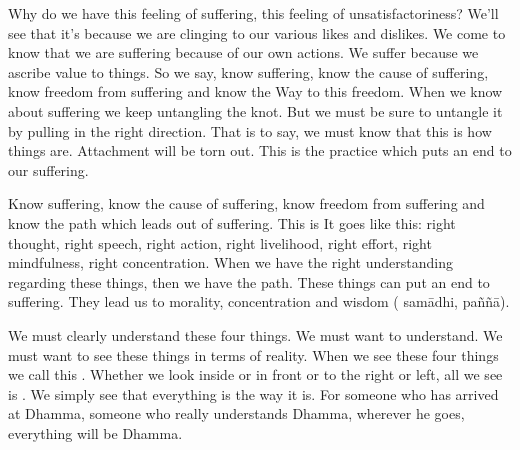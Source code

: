 Why do we have this feeling of suffering, this feeling of unsatisfactoriness? We'll see that it's because we are clinging to our various likes and dislikes. We come to know that we are suffering because of our own actions. We suffer because we ascribe value to things. So we say, know suffering, know the cause of suffering, know freedom from suffering and know the Way to this freedom. When we know about suffering we keep untangling the knot. But we must be sure to untangle it by pulling in the right \mbox{direction.} That is to say, we must know that this is how things are. Attachment will be torn out. This is the practice which puts an end to our suffering. 

Know suffering, know the cause of suffering, know freedom from suffering and know the path which leads out of suffering. This is  It goes like this:  right thought, right speech, right action, right livelihood, right effort, right mindfulness, right concentration. When we have the right understanding regarding these things, then we have the path. These things can put an end to suffering. They lead us to morality, concentration and wisdom ( sam\=adhi, pa\~n\~n\=a). 

We must clearly understand these four things. We must want to understand. We must want to see these things in terms of reality. When we see these four things we call this . Whether we look inside or in front or to the right or left, all we see is . We simply see that everything is the way it is. For someone who has arrived at Dhamma, someone who really understands Dhamma, wherever he goes, everything will be Dhamma. 

